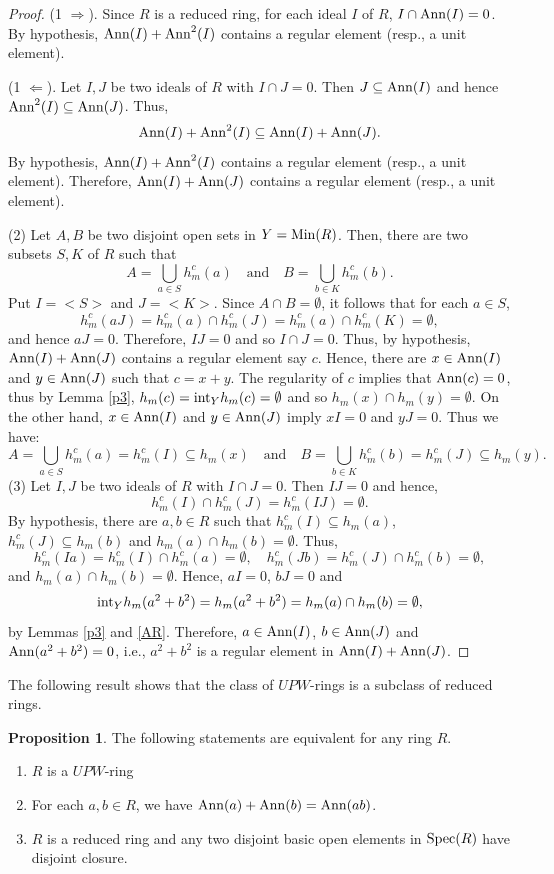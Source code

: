 \documentclass{amsart}
\theoremstyle{definition}
\theoremstyle{remark}
\numberwithin{equation}{section}
\newcommand{\Ann}{{\rm Ann}}
\newcommand{\rint}{{\rm int}}
\newcommand{\Min}{{\rm Min}}
\newcommand{\Spec}{{\rm Spec}}
\newcommand{\RTA}{\Rightarrow}
\newcommand{\LTA}{\Leftarrow}
\def\RTA {\Rightarrow }
\def\LTA {\Leftarrow }
\theoremstyle{definition}\newtheorem{thm}{Theorem}[section]
\theoremstyle{definition}\newtheorem{cor}[thm]{Corollary}
\theoremstyle{definition}\newtheorem{lem}[thm]{Lemma}
\theoremstyle{definition}\newtheorem{prop}[thm]{Proposition}
\theoremstyle{definition}\newtheorem{defn}[thm]{Definition}
\theoremstyle{definition}\newtheorem{Rem}[thm]{Remark}
\theoremstyle{remark}\newtheorem{rem}[thm]{Remark}
\theoremstyle{definition}\newtheorem{exam}[thm]{Example}
\theoremstyle{definition}\newtheorem{qu}[thm]{question}
\begin{document}
\begin{proof}
(1 $\RTA$). Since $R$ is a reduced ring, for each ideal $I$ of $R$, $I\cap \Ann(I)=0$. By hypothesis, $\Ann(I)+\Ann^{2}(I)$ contains a regular element (resp., a unit element).

(1 $\LTA$). Let $I, J$ be two ideals of $R$ with $I\cap J=0$. Then $J\subseteq\Ann(I)$ and hence $\Ann^{2}(I)\subseteq\Ann(J)$. Thus, \[\Ann(I)+\Ann^{2}(I)\subseteq \Ann(I)+\Ann(J).\] By hypothesis, $\Ann(I)+\Ann^{2}(I)$ contains a regular element (resp., a unit element). Therefore, $\Ann(I)+\Ann(J)$ contains a regular element (resp., a unit element).

(2)  Let $A, B$ be two disjoint open sets in $Y=\Min(R)$. Then,  there are two subsets $S, K$ of $R$ such that \[A=\bigcup_{a\in S}h_m^c(a) \quad\text{and}\quad B=\bigcup_{b\in K}h_m^c(b).\] Put $I=<S>$ and $J=<K>$. Since $A\cap B=\emptyset$, it follows that for each $a\in S$,  \[h_m^c(aJ)=h_m^c(a)\cap h_m^c(J)=h_m^c(a)\cap h_m^c(K)=\emptyset,\] and hence $aJ=0$. Therefore, $IJ=0$ and so $I\cap J=0$. Thus, by hypothesis, $\Ann(I)+\Ann(J)$ contains a regular element say $c$. Hence, there are $x\in \Ann(I)$ and $y\in\Ann(J)$ such that $c=x+y$. The regularity of $c$ implies that $\Ann(c)=0$, thus by Lemma \ref{p3}, $h_m(c)=\rint_Yh_m(c)=\emptyset$ and so $h_m(x)\cap h_m(y)=\emptyset$. On the other hand, $x\in\Ann(I)$ and $y\in\Ann(J)$ imply $xI=0$ and $yJ=0$. Thus we have:
\[A=\bigcup_{a\in S}h_m^c(a)=h_m^c(I)\subseteq h_m(x)\quad\text{and}\quad B=\bigcup_{b\in K}h_m^c(b)=h_m^c(J)\subseteq h_m(y).\]
(3) Let $I, J$ be two  ideals of $R$ with $I\cap J=0$. Then $IJ=0$ and hence, \[h_m^c(I)\cap h_m^c(J)=h_m^c(IJ)=\emptyset.\] By hypothesis, there are $a, b\in R$ such that $h_m^c(I)\subseteq h_m(a)$, $h_m^c(J)\subseteq h_m(b)$ and $h_m(a)\cap h_m(b)=\emptyset$. Thus, \[h_m^c(Ia)=h_m^c(I)\cap h_m^c(a)=\emptyset,\quad  h_m^c(Jb)=h_m^c(J)\cap h_m^c(b)=\emptyset,\] and $h_m(a)\cap h_m(b)=\emptyset$. Hence, $aI=0$, $bJ=0$ and \[\rint_Yh_m(a^2+ b^2)=h_m(a^2+ b^2)=h_m(a)\cap h_m(b)=\emptyset,\] by Lemmas \ref{p3} and  \ref{AR}. Therefore, $a\in\Ann(I)$, $b\in\Ann(J)$ and $\Ann(a^2+ b^2)=0$, i.e., $a^2+ b^2$ is a regular element in $\Ann(I)+\Ann(J)$.
\end{proof}
The following result shows that the class of $UPW$-rings is a subclass of reduced rings.
\begin{prop}\label{dava}
The following statements are equivalent for any ring $R$.
\begin{enumerate}
\item $R$ is  a $UPW$-ring 

\item For each $a, b\in R$, we have $\Ann(a)+\Ann(b)=\Ann(ab)$.

\item $R$  is a reduced ring and any two disjoint basic open elements in $\Spec(R)$ have disjoint closure.
\end{enumerate}
\end{prop}
\end{document}
